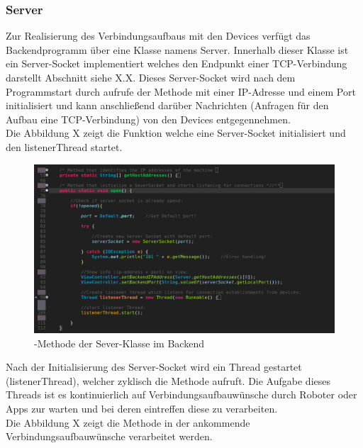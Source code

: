 \subsubsection{Server}
Zur Realisierung des Verbindungsaufbaus mit den Devices verfügt das Backendprogramm über eine Klasse namens Server. Innerhalb dieser Klasse ist ein
Server-Socket implementiert welches den Endpunkt einer TCP-Verbindung darstellt Abschnitt siehe X.X. Dieses Server-Socket wird
nach dem Programmstart durch aufrufe der Methode  mit einer IP-Adresse und einem Port initialisiert und kann anschließend 
darüber Nachrichten (Anfragen für den Aufbau eine TCP-Verbindung) von den Devices entgegennehmen. \\
Die Abbildung X zeigt die Funktion  welche eine Server-Socket initialisiert und den listenerThread startet.
\begin{figure}[ht]
	\centering
	\includegraphics[width=1.0\textwidth]{images/implementation/SeverOpenMethod.png}
	\caption[-Methode der Sever-Klasse im Backend]{-Methode der Sever-Klasse im Backend}
\end{figure}
Nach der Initialisierung des Server-Socket wird ein Thread gestartet (listenerThread), welcher zyklisch die Methode 
aufruft. Die Aufgabe dieses Threads ist es kontinuierlich auf Verbindungsaufbauwünsche durch Roboter oder Apps zur warten und bei
deren eintreffen diese zu verarbeiten. \\
Die Abbildung X zeigt die Methode  in der ankommende Verbindungsaufbauwünsche verarbeitet werden.
